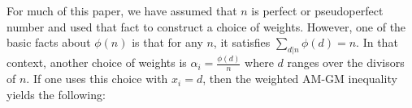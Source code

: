 \documentclass{article}
\begin{document}













For much of this paper, we have assumed that $n$ is perfect or pseudoperfect number and used that fact to construct a choice of weights. However, one of the basic facts about $\phi(n)$ is that for any $n$, it satisfies $\sum_{d|n} \phi(d) =n$. In that context, another choice of weights is $\alpha_i = \frac{\phi(d)}{n}$ where $d$ ranges over the divisors of $n$. If one uses this choice with $x_i=d$, then the weighted AM-GM inequality yields the following:
\end{document}
